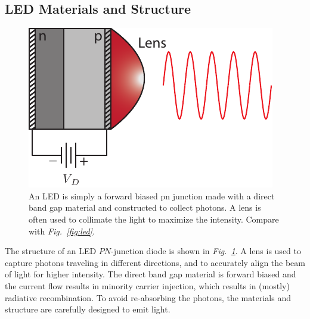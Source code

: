 \subsection{LED Materials and Structure}
\begin{figure}[tb]
\centering
\includegraphics[width=.35\columnwidth]{led_struct}
\caption{An LED is simply a forward biased pn junction made with a direct band gap material and constructed to collect photons.  A lens is often used to collimate the light to maximize the intensity.  Compare with \emph{Fig.~\ref{fig:led}}.}
\label{fig:led_struct}
\end{figure}
The structure of an LED $PN$-junction diode is shown in \emph{Fig.~\ref{fig:led_struct}}.  A lens is used to capture photons traveling in different directions, and to accurately align the beam of light for higher intensity.  The direct band gap material is forward biased and the current flow results in minority carrier injection, which results in (mostly) radiative recombination.  To avoid re-absorbing the photons, the materials and structure are carefully designed to emit light. 

